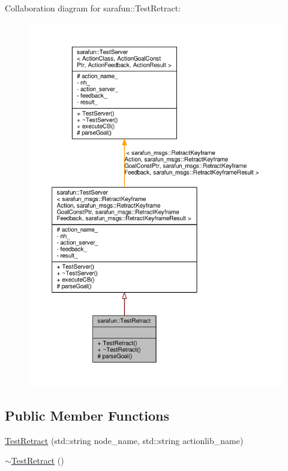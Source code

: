 Collaboration diagram for sarafun\-:\-:Test\-Retract\-:
\nopagebreak
\begin{figure}[H]
\begin{center}
\leavevmode
\includegraphics[width=350pt]{da/d86/classsarafun_1_1TestRetract__coll__graph}
\end{center}
\end{figure}
\subsection*{Public Member Functions}
\begin{DoxyCompactItemize}
\item 
\hyperlink{classsarafun_1_1TestRetract_a82a06a6ab0232efbe0826ec719a05b60_a82a06a6ab0232efbe0826ec719a05b60}{Test\-Retract} (std\-::string node\-\_\-name, std\-::string actionlib\-\_\-name)
\item 
\hyperlink{classsarafun_1_1TestRetract_a726afd78008fdc6c7b6226ea56306f30_a726afd78008fdc6c7b6226ea56306f30}{$\sim$\-Test\-Retract} ()
\end{DoxyCompactItemize}
